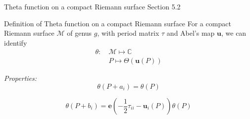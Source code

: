 \documentclass[11pt,aspectratio=169]{beamer}
\newcommand{\ee}[0]{\mathbf{e}}
\begin{document}
\begin{frame}{Theta function on a compact Riemann surface}{\tiny \cite{Ber06} Section 5.2}
    \begin{block}{Definition of Theta function on a compact Riemann surface}
        For a compact Riemann surface $\mathcal M$ of genus $g$, with period matrix $\tau$ and Abel's map $\mathbf{u}$, we can identify
        \begin{align*}
            \theta : \ & \mathcal M \mapsto \mathbb C \\
            & P \mapsto \Theta(\mathbf{u}(P))
        \end{align*}
    \end{block}

    \emph{Properties:}
    \[ \theta(P + a_i) = \theta(P) \]

    \[ \theta(P + b_i) = \ee\left(- \frac{1}{2} \tau_{ii} - \mathbf{u}_i(P)\right)\theta(P) \]
\end{frame}
\end{document}

